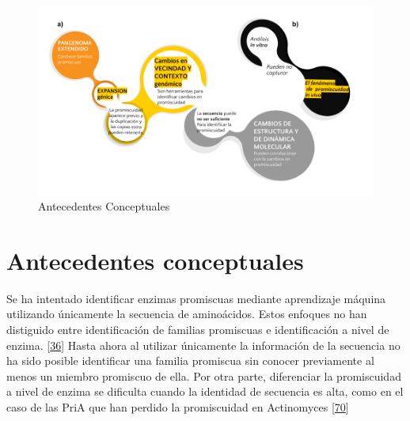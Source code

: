\documentclass[12pt,twoside]{reedthesis}
\begin{document}
  \begin{figure}[h!tbp]
  \centering
  \includegraphics[angle = 0,scale = 0.5]{chapter0/AntecedentesConceptuales.png}
  \caption[Antecedentes Conceptuales]{\normalsize{Antecedentes Conceptuales}}
  \label{fig:Antecedentes conceptuales de promiscuidad}
  \end{figure}
  
  \nocite{@carbonell_molecular_2010,@juarez-vazquez_evolution_2017,@noda_tesis_2012,@soskine_mutational_2010,@aharoni_evolvability_2005,@bloom_neutral_2007,@zhao__function_prediction_neighbourhood_2014,@juarez-vazquez_evolution_2017,@martinez-nunez_lifestyle_2015,@zou_evolution_2015, @gatti-lafranconi_flexibility_2013}
  
  \section{Antecedentes conceptuales}\label{antecedentes-conceptuales}
  
  Se ha intentado identificar enzimas promiscuas mediante aprendizaje
  máquina utilizando únicamente la secuencia de aminoácidos. Estos
  enfoques no han distiguido entre identificación de familias promiscuas e
  identificación a nivel de enzima.
  {[}\protect\hyperlink{ref-carbonell_molecular_2010}{36}{]} Hasta ahora
  al utilizar únicamente la información de la secuencia no ha sido posible
  identificar una familia promiscua sin conocer previamente al menos un
  miembro promiscuo de ella. Por otra parte, diferenciar la promiscuidad a
  nivel de enzima se dificulta cuando la identidad de secuencia es alta,
  como en el caso de las PriA que han perdido la promiscuidad en
  Actinomyces
  {[}\protect\hyperlink{ref-juarez-vazquez_evolution_2017}{70}{]}
  
\end{document}
